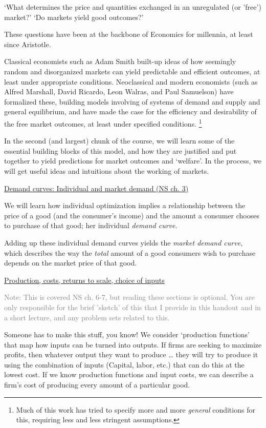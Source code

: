 \documentclass[]{article}
\let\rmarkdownfootnote\footnote%
\def\footnote{\protect\rmarkdownfootnote}
\begin{document}
`What determines the price and quantities exchanged in an unregulated (or 'free') market?' `Do markets yield good outcomes?'

These questions have been at the backbone of Economics for millennia, at least since Aristotle.

Classical economists such as Adam Smith built-up ideas of how seemingly random and disorganized markets can yield predictable and efficient outcomes, at least under appropriate conditions.
Neoclassical and modern economists (such as Alfred Marshall, David Ricardo, Leon Walras, and Paul Samuelson) have formalized these, building models involving of systems of demand and supply and general equilibrium, and have made the case for the efficiency and desirability of the free market outcomes, at least under specified conditions. \footnote{Much of this work has tried to specify more and more \emph{general} conditions for this, requiring less and less stringent assumptions.}

In the second (and largest) chunk of the course, we will learn some of the essential building blocks of this model, and how they are justified and put together to yield predictions for market outcomes and `welfare'. In the process, we will get useful ideas and intuitions about the working of markets.

\underline{Demand curves: Individual and market demand (NS ch. 3)}

We will learn how individual optimization implies a relationship between the price of a good (and the consumer's income) and the amount a consumer chooses to purchase of that good; her individual \emph{demand curve}.

Adding up these individual demand curves yields the \emph{market demand curve}, which describes the way the \emph{total} amount of a good consumers wish to purchase depends on the market price of that good.

\underline{Production, costs, returns to scale, choice of inputs}

\textcolor{gray}{Note: This is covered NS ch. 6-7, but reading these sections is optional. You are only responsible for the brief 'sketch' of this that I provide in this handout and in a short lecture, and any problem sets related to this.}

Someone has to make this stuff, you know! We consider `production functions' that map how inputs can be turned into outputs. If firms are seeking to maximize profits, then whatever output they want to produce \ldots{} they will try to produce it using the combination of inputs (Capital, labor, etc.) that can do this at the lowest cost. If we know production functions and input costs, we can describe a firm's cost of producing every amount of a particular good.
\end{document}
